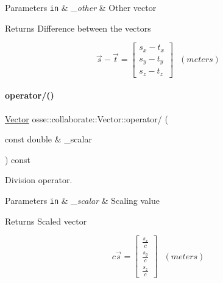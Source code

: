 \begin{DoxyParams}[1]{Parameters}
\mbox{\tt in}  & {\em \+\_\+other} & Other vector \\
\hline
\end{DoxyParams}
\begin{DoxyReturn}{Returns}
Difference between the vectors
\end{DoxyReturn}
\[ \vec{s} - \vec{t} = \begin{bmatrix} s_x - t_x \\ s_y - t_y \\ s_z - t_z \end{bmatrix} ~~~(meters) \] \mbox{\label{classosse_1_1collaborate_1_1_vector_aeaa64febdb5435cbd3c1e747e9920a11}} 
\paragraph{\texorpdfstring{operator/()}{operator/()}}
{\footnotesize\ttfamily \hyperlink{classosse_1_1collaborate_1_1_vector}{Vector} osse\+::collaborate\+::\+Vector\+::operator/ (\begin{DoxyParamCaption}\item[{const double \&}]{\+\_\+scalar }\end{DoxyParamCaption}) const\hspace{0.3cm}{\ttfamily [inline]}}



Division operator. 


\begin{DoxyParams}[1]{Parameters}
\mbox{\tt in}  & {\em \+\_\+scalar} & Scaling value \\
\hline
\end{DoxyParams}
\begin{DoxyReturn}{Returns}
Scaled vector
\end{DoxyReturn}
\[ c\vec{s}=\begin{bmatrix}\frac{s_x}{c}\\\frac{s_y}{c}\\\frac{s_z}{c} \end{bmatrix}~~~(meters) \] \mbox{\label{classosse_1_1collaborate_1_1_vector_a52ba4cdc72da4646b3868af7f51b100d}} 
